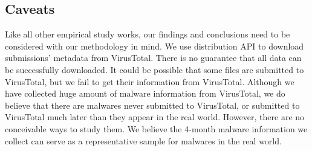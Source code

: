 \subsection{Caveats}
Like all other empirical study works, 
our findings and conclusions need to be considered with our methodology in mind. 
We use distribution API to download submissions' metadata from VirusTotal. 
There is no guarantee that all data can be successfully downloaded. 
It could be possible that some files are submitted to VirusTotal, 
but we fail to get their information from VirusTotal.
Although we have collected huge amount of malware information from VirusTotal,
we do believe that there are malwares never submitted to VirusTotal, 
or submitted to VirusTotal much later than they appear in the real world. 
However, there are no conceivable ways to study them.
We believe the 4-month malware information we collect can serve as a representative sample for malwares in the real world. 
